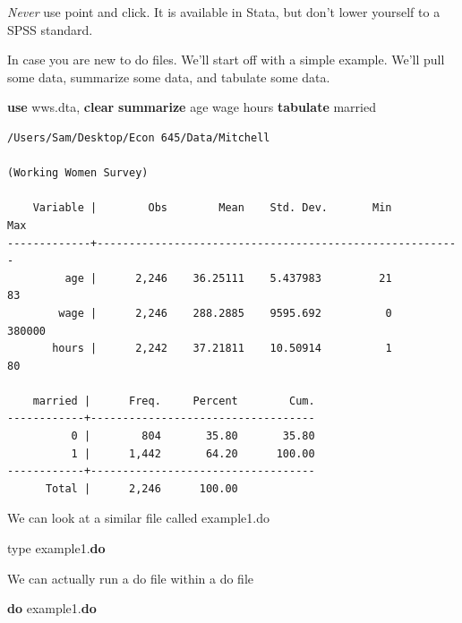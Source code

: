 \documentclass[
]{book}
\newenvironment{Shaded}{\begin{snugshade}}{\end{snugshade}}
\newcommand{\DecValTok}[1]{\textcolor[rgb]{0.00,0.00,0.81}{#1}}
\newcommand{\KeywordTok}[1]{\textcolor[rgb]{0.13,0.29,0.53}{\textbf{#1}}}
\newcommand{\NormalTok}[1]{#1}
\begin{document}
\emph{Never} use point and click. It is available in Stata, but don't lower yourself to a SPSS standard.

In case you are new to do files. We'll start off with a simple example. We'll pull some data, summarize some data, and tabulate some data.

\begin{Shaded}
\begin{Highlighting}[]
\KeywordTok{use}\NormalTok{ wws.dta, }\KeywordTok{clear}
\KeywordTok{summarize}\NormalTok{ age wage hours}
\KeywordTok{tabulate}\NormalTok{ married}
\end{Highlighting}
\end{Shaded}

\begin{verbatim}
/Users/Sam/Desktop/Econ 645/Data/Mitchell

(Working Women Survey)

    Variable |        Obs        Mean    Std. Dev.       Min        Max
-------------+---------------------------------------------------------
         age |      2,246    36.25111    5.437983         21         83
        wage |      2,246    288.2885    9595.692          0     380000
       hours |      2,242    37.21811    10.50914          1         80

    married |      Freq.     Percent        Cum.
------------+-----------------------------------
          0 |        804       35.80       35.80
          1 |      1,442       64.20      100.00
------------+-----------------------------------
      Total |      2,246      100.00
\end{verbatim}

We can look at a similar file called example1.do

\begin{Shaded}
\begin{Highlighting}[]
    \DecValTok{type}\NormalTok{ example1.}\KeywordTok{do}
\end{Highlighting}
\end{Shaded}

We can actually run a do file within a do file

\begin{Shaded}
\begin{Highlighting}[]
\KeywordTok{do}\NormalTok{ example1.}\KeywordTok{do}
\end{Highlighting}
\end{Shaded}
\end{document}
